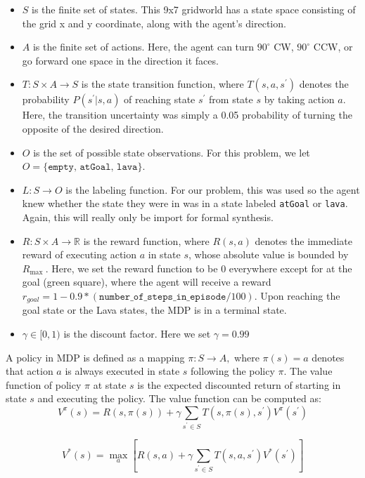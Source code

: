 \begin{itemize}
    \item \(S\) is the finite set of states. This 9x7 gridworld has a state space consisting of the grid x and y coordinate, along with the agent's direction.
    \item \(A\) is the finite set of actions. Here, the agent can turn $90^{\circ}$ CW, $90^{\circ}$ CCW, or go forward one space in the direction it faces.
    \item \(T: S \times A \rightarrow S\) is the state transition function, where \(T\left(s, a, s^{\prime}\right)\) denotes the probability
\(P\left(s^{\prime} | s, a\right)\) of reaching state \(s^{\prime}\) from state \(s\) by taking action \(a\). Here, the transition uncertainty was simply a 0.05 probability of turning the opposite of the desired direction.
    \item $O$ is the set of possible state observations. For this problem, we let $O = \{\texttt{empty, atGoal, lava}\}$.
    \item $L: S \rightarrow O$ is the labeling function. For our problem, this was used so the agent knew whether the state they were in was in a state labeled \texttt{atGoal} or \texttt{lava}. Again, this will really only be import for formal synthesis.
    \item \(R: S \times A \rightarrow \mathbb{R}\) is the reward function, where \(R(s, a)\) denotes the immediate reward of executing
action \(a\) in state \(s\), whose absolute value is bounded by \(R_{\text {max }}\).  Here, we set the reward function to be 0 everywhere except for at the goal (green square), where the agent will receive a reward $r_{goal} = 1 - 0.9 * (\texttt{number\_of\_steps\_in\_episode} / 100)$. Upon reaching the goal state or the Lava states, the MDP is in a terminal state.
    \item \(\gamma \in[0,1)\) is the discount factor. Here we set $\gamma = 0.99$
\end{itemize}

A policy in MDP is defined as a mapping \(\pi: S \rightarrow A,\) where \(\pi(s)=a\) denotes that action \(a\) is
always executed in state \(s\) following the policy \(\pi .\) The value function of policy \(\pi\) at state \(s\) is the expected discounted return of starting in state \(s\) and executing the policy. The value function can be computed as:
$$
V^{\pi}(s)=R(s, \pi(s))+\gamma \sum_{s^{\prime} \in S} T\left(s, \pi(s), s^{\prime}\right) V^{\pi}\left(s^{\prime}\right)
$$

$$
V^{*}(s)=\max _{a}\left[R(s, a)+\gamma \sum_{s^{\prime} \in S} T\left(s, a, s^{\prime}\right) V^{*}\left(s^{\prime}\right)\right]
$$

